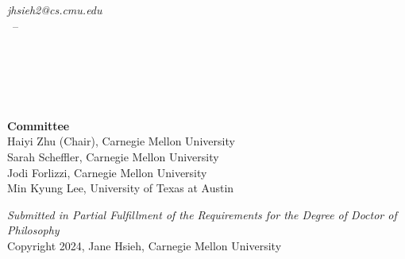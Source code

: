 \begin{titlepage}
    \begin{addmargin}[-1cm]{-3cm}
    \begin{center}
        \large  

        \hfill

        \vfill

        \begingroup            \color{Maroon}\spacedallcaps{\myTitle} \spacedallcaps{\mySubtitle} \\ \bigskip
        \endgroup

        \spacedlowsmallcaps{\myName} \\
        \textit{jhsieh2@cs.cmu.edu} \\
        \myTime\ -- \myVersion
        \vfill

        


        \myDepartment \\                      
        \mySchool \\
        \myUni \\ 
        \myLocation \\
        \bigskip

        \textbf{Committee} \\
        Haiyi Zhu (Chair), Carnegie Mellon University \\
        Sarah Scheffler, Carnegie Mellon University \\
        Jodi Forlizzi, Carnegie Mellon University \\
        Min Kyung Lee, University of Texas at Austin
        \vfill

        \textit{Submitted in Partial Fulfillment of the Requirements for the Degree of Doctor of Philosophy} \\
        Copyright 2024, Jane Hsieh, Carnegie Mellon University

    \end{center}  
  \end{addmargin}       
\end{titlepage}   